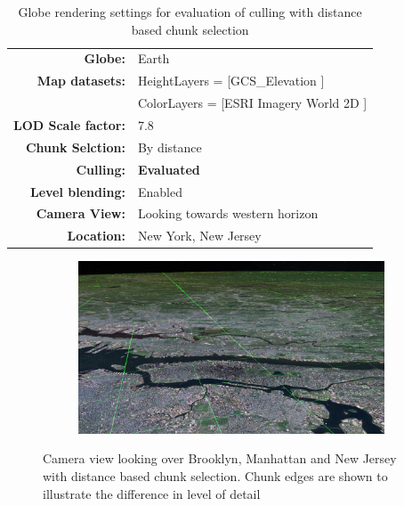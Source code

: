 \begin{table}[h]
  \centering
  \caption[]{Globe rendering settings for evaluation of culling with distance based chunk selection}
  \label{table:cullingdsettings}
  \begin{tabular}{| r l |}
    \hline
      \textbf{Globe:}             & Earth \\
      \textbf{Map datasets:}      & HeightLayers = [GCS\_Elevation \cite{worldelevation3d}] \\
                                  & ColorLayers = [ESRI Imagery World 2D \cite{imageryworld2d}] \\
      \textbf{LOD Scale factor:}  & 7.8 \\
      \textbf{Chunk Selction:}    & By distance \\
      \textbf{Culling:}           & \textbf{Evaluated} \\
      \textbf{Level blending:}    & Enabled \\
      \textbf{Camera View:}       & Looking towards western horizon\\
      \textbf{Location:}          & New York, New Jersey\\
    \hline
  \end{tabular}
\end{table}

\begin{figure}[h]
    \centering
    \begin{subfigure}[bt]{1.0\textwidth}
        \includegraphics[width=\textwidth]{figures/results/culling/cam_d.png}
    \end{subfigure}
    \caption{Camera view looking over Brooklyn, Manhattan and New Jersey with distance based chunk selection. Chunk edges are shown to illustrate the difference in level of detail}
    \label{fig:cullingdcam}
\end{figure}


